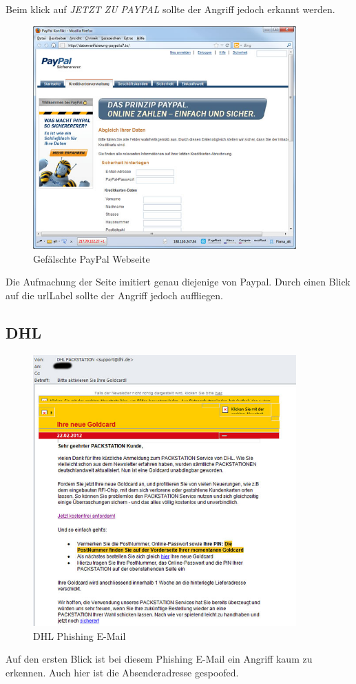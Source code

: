 Beim klick auf \textit{JETZT ZU PAYPAL} sollte der Angriff jedoch erkannt werden.
\begin{figure}[H]
  \centering
  \includegraphics[width=0.9\textwidth]{images/phishing-beispiel-paypal4.jpg}
  \caption{Gefälschte PayPal Webseite}
  \label{fig:phishing:beispiele:paypalfortgeschrittenwebseite}
\end{figure}
Die Aufmachung der Seite imitiert genau diejenige von Paypal. Durch einen Blick auf die \Gls{urlLabel} sollte der Angriff jedoch auffliegen.

\subsection{DHL}
\begin{figure}[H]
  \centering
  \includegraphics[width=0.9\textwidth]{images/phishing-beispiel-dhl.jpg}
  \caption{DHL Phishing E-Mail}
  \label{fig:phishing:beispiele:dhl}
\end{figure}
Auf den ersten Blick ist bei diesem Phishing E-Mail ein Angriff kaum zu erkennen. Auch hier ist die Absenderadresse gespoofed.

